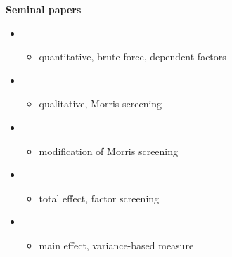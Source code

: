 \begin{frame}[allowframebreaks]\textbf{Seminal papers}\vspace{0.3cm}

\begin{itemize}\small
\item {}\\
\begin{itemize}\footnotesize
	\item \footnotesize quantitative, brute force, dependent factors
\end{itemize}
\item {}\\
\begin{itemize}\footnotesize
	\item \footnotesize qualitative, Morris screening
\end{itemize}
\end{itemize}

\end{frame}
\begin{frame}[allowframebreaks]\vspace{0.3cm}

\begin{itemize}\small
	\item {}\\
		\begin{itemize}\footnotesize
			\item \footnotesize modification of Morris screening
		\end{itemize}
\item {}\\
	\begin{itemize}\footnotesize
		\item \footnotesize total effect, factor screening
	\end{itemize}
\item {}\\
	\begin{itemize}\footnotesize
		\item \footnotesize main effect, variance-based measure
	\end{itemize}

\end{itemize}

\end{frame}

